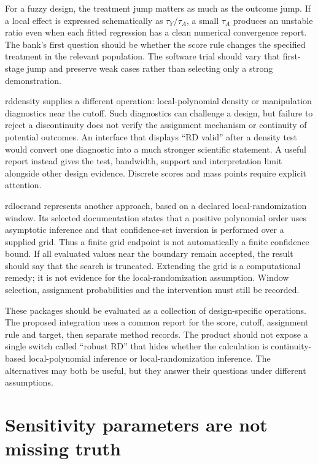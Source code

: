 For a fuzzy design, the treatment jump matters as much as the outcome jump.
If a local effect is expressed schematically as \(\tau_Y/\tau_A\), a small
\(\tau_A\) produces an unstable ratio even when each fitted regression has a
clean numerical convergence report. The bank's first question should be
whether the score rule changes the specified treatment in the relevant
population. The software trial should vary that first-stage jump and preserve
weak cases rather than selecting only a strong demonstration.

rddensity supplies a different operation: local-polynomial density or
manipulation diagnostics near the cutoff. Such diagnostics can challenge a
design, but failure to reject a discontinuity does not verify the assignment
mechanism or continuity of potential outcomes. An interface that displays
``RD valid'' after a density test would convert one diagnostic into a much
stronger scientific statement. A useful report instead gives the test,
bandwidth, support and interpretation limit alongside other design evidence.
Discrete scores and mass points require explicit attention.\cite{v12_sw_rddensity}

rdlocrand represents another approach, based on a declared local-randomization
window. Its selected documentation states that a positive polynomial order
uses asymptotic inference and that confidence-set inversion is performed over
a supplied grid. Thus a finite grid endpoint is not automatically a finite
confidence bound. If all evaluated values near the boundary remain accepted,
the result should say that the search is truncated. Extending the grid is a
computational remedy; it is not evidence for the local-randomization assumption.
Window selection, assignment probabilities and the intervention must still be
recorded.\cite{v12_sw_rdlocrand}

These packages should be evaluated as a collection of design-specific
operations. The proposed integration uses a common report for the score,
cutoff, assignment rule and target, then separate method records. The product
should not expose a single switch called ``robust RD'' that hides whether the
calculation is continuity-based local-polynomial inference or local-randomization
inference. The alternatives may both be useful, but they answer their questions
under different assumptions.

\section{Sensitivity parameters are not missing truth}

